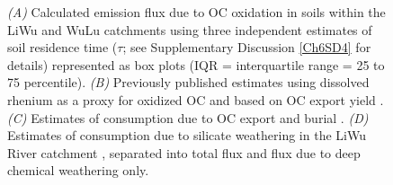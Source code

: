 \begin{figure}[p]
	\caption[ source and sink flux estimates from various processes in the Central Range]{\textit{(A)} Calculated  emission flux due to OC oxidation in soils within the LiWu and WuLu catchments using three independent estimates of soil residence time ($\tau$; see Supplementary Discussion \ref{Ch6SD4} for details) represented as box plots (IQR = interquartile range = 25 to 75 percentile). \textit{(B)} Previously published estimates using dissolved rhenium as a proxy for oxidized OC \citep[orange bars;][]{Hilton:2014dh} and based on OC export yield \citep[black arrow;][]{Hilton:2011jw}. \textit{(C)} Estimates of  consumption due to OC export and burial \citep[mean $\pm 1$ std. dev.;][]{Hilton:2012dt}. \textit{(D)} Estimates of  consumption due to silicate weathering in the LiWu River catchment \citep{Calmels:2011gv}, separated into total flux and flux due to deep chemical weathering only.}

\end{figure}
